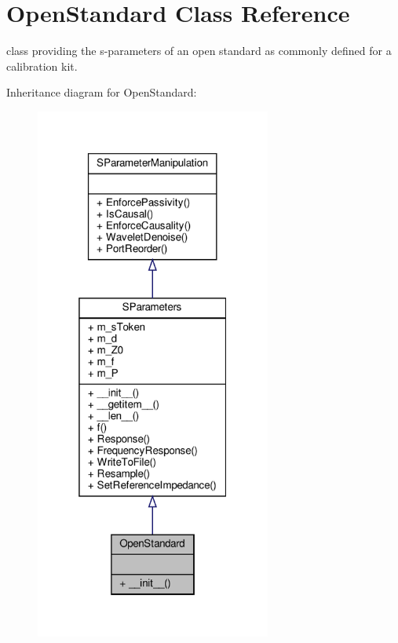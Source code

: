 \hypertarget{classSignalIntegrity_1_1Measurement_1_1CalKit_1_1Standards_1_1OpenStandard_1_1OpenStandard}{}\section{Open\+Standard Class Reference}
\label{classSignalIntegrity_1_1Measurement_1_1CalKit_1_1Standards_1_1OpenStandard_1_1OpenStandard}


class providing the s-\/parameters of an open standard as commonly defined for a calibration kit.  




Inheritance diagram for Open\+Standard\+:
\nopagebreak
\begin{figure}[H]
\begin{center}
\leavevmode
\includegraphics[width=220pt]{classSignalIntegrity_1_1Measurement_1_1CalKit_1_1Standards_1_1OpenStandard_1_1OpenStandard__inherit__graph}
\end{center}
\end{figure}


